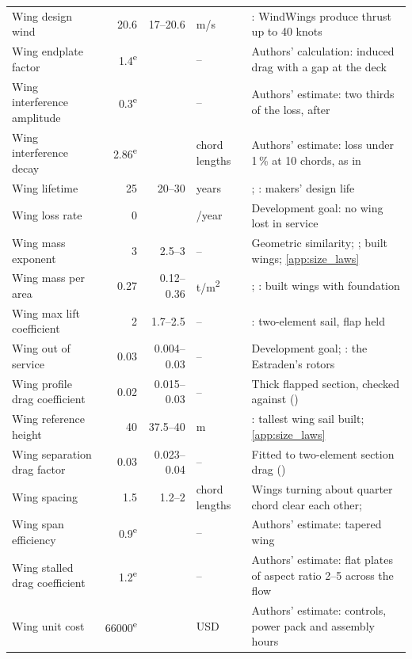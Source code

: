 \begin{longtable}{@{}>{\raggedright\arraybackslash}p{3.4cm}rr>{\raggedright\arraybackslash}p{1.4cm}>{\raggedright\arraybackslash}p{5.8cm}@{}}
Wing design wind & \num{20.6} & \num{17}--\num{20.6} & m/s & \citet{bar2026windwingscontrol}: WindWings produce thrust up to 40 knots \\
Wing endplate factor & \num{1.4}\textsuperscript{e} &  & -- & Authors' calculation: induced drag with a gap at the deck \\
Wing interference amplitude & \num{0.3}\textsuperscript{e} &  & -- & Authors' estimate: two thirds of the \citet{malmek2024} loss, after \citet{vanreen2026} \\
Wing interference decay & \num{2.86}\textsuperscript{e} &  & chord lengths & Authors' estimate: loss under 1\,\% at 10 chords, as in \citet{wang2024} \\
Wing lifetime & \num{25} & \num{20}--\num{30} & years & \citet{oceanbird2026wing560}; \citet{bar2026windwings}: makers' design life \\
Wing loss rate & \num{0} &  & 1/year & Development goal: no wing lost in service \\
Wing mass exponent & \num{3} & \num{2.5}--\num{3} & -- & Geometric similarity; \citet[blade mass]{fingersh2006}; built wings; \cref{app:size_laws} \\
Wing mass per area & \num{0.27} & \num{0.12}--\num{0.36} & t/m\textsuperscript{2} & \citet{riviera2024windwing}; \citet{oceanbird2026wing560}: built wings with foundation \\
Wing max lift coefficient & \num{2} & \num{1.7}--\num{2.5} & -- & \citet[Fig. 5]{wright2024wingsail}: two-element sail, flap held \\
Wing out of service & \num{0.03} & \num{0.004}--\num{0.03} & -- & Development goal; \citet{spliethoff2021}: the Estraden's rotors \\
Wing profile drag coefficient & \num{0.02} & \num{0.015}--\num{0.03} & -- & Thick flapped section, checked against (\citealp[Table 2]{yao2026}) \\
Wing reference height & \num{40} & \num{37.5}--\num{40} & m & \citet{alfalaval2026oceanbird}: tallest wing sail built; \cref{app:size_laws} \\
Wing separation drag factor & \num{0.03} & \num{0.023}--\num{0.04} & -- & Fitted to two-element section drag (\citealp[Tables 2 and 6]{yao2026}) \\
Wing spacing & \num{1.5} & \num{1.2}--\num{2} & chord lengths & Wings turning about quarter chord clear each other; \citet{wang2024} \\
Wing span efficiency & \num{0.9}\textsuperscript{e} &  & -- & Authors' estimate: tapered wing \\
Wing stalled drag coefficient & \num{1.2}\textsuperscript{e} &  & -- & Authors' estimate: flat plates of aspect ratio 2--5 across the flow \\
Wing unit cost & \num{66000}\textsuperscript{e} &  & USD & Authors' estimate: controls, power pack and assembly hours \\
\end{longtable}
